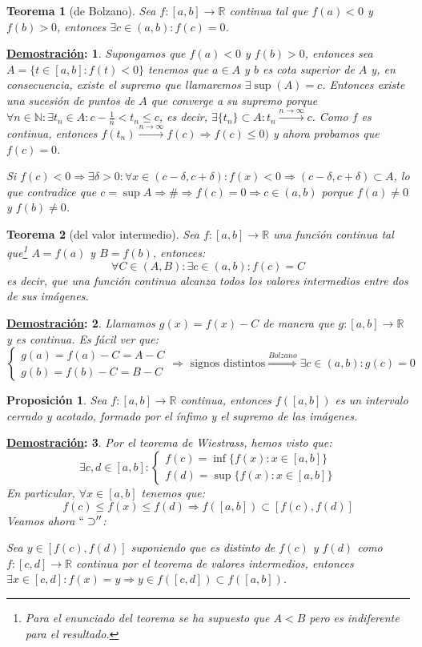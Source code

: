 \documentclass[10pt,a4paper,openright]{book}
\theoremstyle{break}
\newtheorem*{theo}{Teorema}
\newtheorem*{prop}{Proposición}
\newtheorem*{demo}{\underline{Demostración}:}
\begin{document}
\begin{theo}[de Bolzano]
Sea $f:[a,b] \rightarrow \mathbb R$ continua tal que $f(a)<0$ y $f(b)>0$, entonces $\exists c\in (a,b): f(c)=0$.
\end{theo}
\begin{demo}
Supongamos que $f(a)<0$ y $f(b)>0$, entonces sea $A=\{t\in [a,b]: f(t)<0\}$ tenemos que $a\in A$ y $b$ es cota superior de $A$ y, en consecuencia, existe el supremo que llamaremos $\exists \sup(A)=c$. Entonces existe una sucesión de puntos de $A$ que converge a su supremo porque $\forall n\in \mathbb N: \exists t_n\in A: c-\frac{1}{n}< t_n\leq c$, es decir, $\exists\{t_n\}\subset A: t_n\xrightarrow{n\rightarrow \infty}c$. Como $f$ es continua, entonces $f(t_n)\xrightarrow{n\rightarrow \infty}f(c)\Rightarrow f(c)\leq 0)$ y ahora probamos que $f(c)=0$.\par
Si $f(c)<0\Rightarrow \exists\delta>0: \forall x\in (c-\delta, c+\delta): f(x)<0\Rightarrow (c-\delta, c+\delta)\subset A$, lo que contradice que $c=\sup A\Rightarrow \#\Rightarrow f(c)=0\Rightarrow c\in (a,b)$ porque $f(a)\neq 0$ y $f(b)\neq 0$.
\end{demo}

\begin{theo}[del valor intermedio]
Sea $f:[a,b] \rightarrow \mathbb R$ una función continua tal que\footnote{Para el enunciado del teorema se ha supuesto que $A < B$ pero es indiferente para el resultado.} $A=f(a)$ y $B=f(b)$, entonces:
$$\forall C \in (A,B) : \exists c \in (a,b) : f(c) = C$$
es decir, que una función continua alcanza todos los valores intermedios entre dos de sus imágenes.
\end{theo}
\begin{demo}
Llamamos $g(x)=f(x)-C$ de manera que $g:[a,b] \rightarrow \mathbb R$ y es continua. Es fácil ver que:
$$\begin{cases}g(a)=f(a)-C=A-C \\ 
g(b)=f(b)-C=B-C \end{cases} \Rightarrow \mbox{ signos distintos}\stackrel{Bolzano}{\Rightarrow} \exists c\in (a,b): g(c)=0$$
\end{demo}

\begin{prop}
Sea $f:[a,b] \rightarrow \mathbb R$ continua, entonces $f([a,b])$ es un intervalo cerrado y acotado, formado por el ínfimo y el supremo de las imágenes.
\end{prop}
\begin{demo}
Por el teorema de Wiestrass, hemos visto que:
$$\exists c,d\in [a,b]:\begin{cases}f(c)=\inf\{f(x): x\in [a,b]\} \\ f(d)=\sup \{f(x):x\in [a,b]\} \end{cases}$$
En particular, $\forall x\in [a,b]$ tenemos que:
$$f(c)\leq f(x)\leq f(d)\Rightarrow f([a,b])\subset [f(c), f(d)]$$
Veamos ahora $``\supset''$:\par
Sea $y\in [f(c), f(d)]$ suponiendo que es distinto de $f(c)$ y $f(d)$ como $f:[c,d]\rightarrow \mathbb R$ continua por el teorema de valores intermedios, entonces $\exists x\in [c,d]: f(x)=y\Rightarrow y\in f([c,d])\subset f([a,b])$.
\end{demo}
\end{document}
